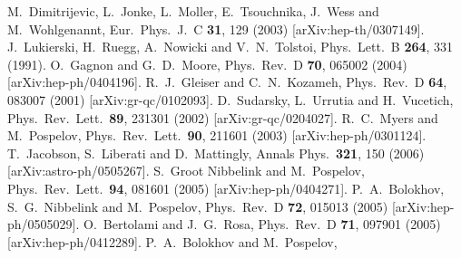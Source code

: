 \documentclass[prl,tightenlines]{revtex4}
\begin{document}
\begin{thebibliography}{99}
  M.~Dimitrijevic, L.~Jonke, L.~Moller, E.~Tsouchnika, J.~Wess and M.~Wohlgenannt,
  Eur.\ Phys.\ J.\  C {\bf 31}, 129 (2003)
  [arXiv:hep-th/0307149].
  J.~Lukierski, H.~Ruegg, A.~Nowicki and V.~N.~Tolstoi,
  Phys.\ Lett.\  B {\bf 264}, 331 (1991).
  O.~Gagnon and G.~D.~Moore,
  Phys.\ Rev.\  D {\bf 70}, 065002 (2004)
  [arXiv:hep-ph/0404196].
  R.~J.~Gleiser and C.~N.~Kozameh,
  Phys.\ Rev.\  D {\bf 64}, 083007 (2001)
  [arXiv:gr-qc/0102093].
  D.~Sudarsky, L.~Urrutia and H.~Vucetich,
  Phys.\ Rev.\ Lett.\  {\bf 89}, 231301 (2002)
  [arXiv:gr-qc/0204027].
  R.~C.~Myers and M.~Pospelov,
  Phys.\ Rev.\ Lett.\  {\bf 90}, 211601 (2003)
  [arXiv:hep-ph/0301124].
  T.~Jacobson, S.~Liberati and D.~Mattingly,
  Annals Phys.\  {\bf 321}, 150 (2006)
  [arXiv:astro-ph/0505267].
  S.~Groot Nibbelink and M.~Pospelov,
  Phys.\ Rev.\ Lett.\  {\bf 94}, 081601 (2005)
  [arXiv:hep-ph/0404271].
  P.~A.~Bolokhov, S.~G.~Nibbelink and M.~Pospelov,
  Phys.\ Rev.\  D {\bf 72}, 015013 (2005)
  [arXiv:hep-ph/0505029].
  O.~Bertolami and J.~G.~Rosa,
  Phys.\ Rev.\  D {\bf 71}, 097901 (2005)
  [arXiv:hep-ph/0412289].
  P.~A.~Bolokhov and M.~Pospelov,

\end{thebibliography}
\end{document}
